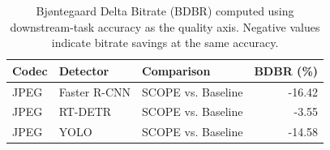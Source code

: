 \begin{table}[t]
\centering
\caption{Bjøntegaard Delta Bitrate (BDBR) computed using downstream-task accuracy as the quality axis. Negative values indicate bitrate savings at the same accuracy.}
\label{tab:ablation_bdbr}
\small
\setlength{\tabcolsep}{6pt}
\begin{tabular}{lllr}
\toprule
Codec & Detector & Comparison & BDBR (\%) \\
\midrule
JPEG & Faster R-CNN & SCOPE vs. Baseline & -16.42 \\
JPEG & RT-DETR & SCOPE vs. Baseline & -3.55 \\
JPEG & YOLO & SCOPE vs. Baseline & -14.58 \\
\bottomrule
\end{tabular}
\end{table}
